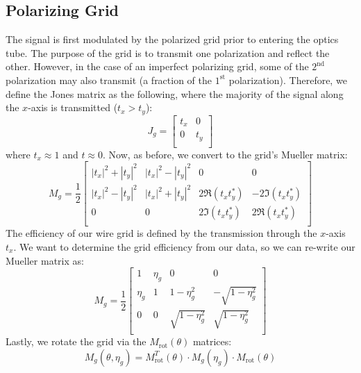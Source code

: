 \subsection{Polarizing Grid}
The signal is first modulated by the polarized grid prior to entering the optics tube.  The purpose of the grid is to transmit one polarization and reflect the other.  However, in the case of an imperfect polarizing grid, some of the $2^{\text{nd}}$ polarization may also transmit (a fraction of the $1^{\text{st}}$ polarization).  Therefore, we define the Jones matrix as the following, where the majority of the signal along the $x$-axis is transmitted ($t_x > t_y$):
\begin{equation}
    J_{g} = \begin{bmatrix}
    t_x & 0 \\
    0 & t_y\\
  \end{bmatrix}
\end{equation}
where $t_x\approx 1$ and $t\approx 0 $.  Now, as before, we convert to the grid's Mueller matrix:
\begin{equation}
    M_{g} =\frac{1}{2} \begin{bmatrix}
    |t_x|^2 + |t_y|^2 & |t_x|^2 - |t_y|^2 & 0& 0\\
    |t_x|^2 - |t_y|^2 & |t_x|^2 + |t_y|^2& 2\Re{(t_x t_y^*)}& -2\Im{(t_x t_y^*)}\\
    0 & 0& 2\Im{(t_x t_y^*)}& 2\Re{(t_x t_y^*)}\\
  \end{bmatrix}
\end{equation}
The efficiency of our wire grid is defined by the transmission through the $x$-axis $t_x$. We want to determine the grid efficiency from our data, so we can re-write our Mueller matrix as:
\begin{equation}
    M_{g} =\frac{1}{2} \begin{bmatrix}
    1 & \eta_g & 0& 0\\
    \eta_g & 1& 1-\eta_g^2 & -\sqrt{1-\eta_g^2}\\
    0 & 0& \sqrt{1-\eta_g^2}& \sqrt{1-\eta_g^2}\\
  \end{bmatrix}
\end{equation}
Lastly, we rotate the grid via the $M_{\text{rot}}(\theta)$ matrices:
\begin{equation}
    M_{g}(\theta,\eta_{g}) = M_{\text{rot}}^T(\theta) \cdot M_{g}(\eta_{g})\cdot M_{\text{rot}}(\theta)
\end{equation}
